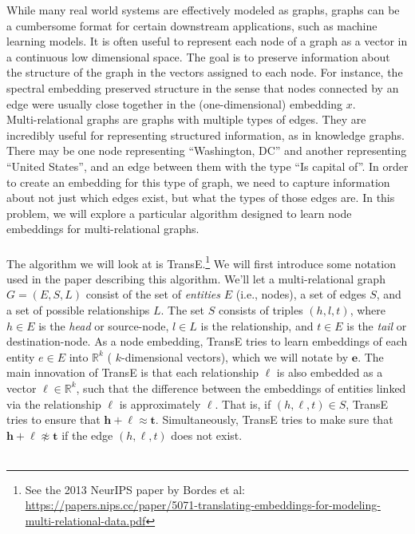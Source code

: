 \documentclass{article}
\numberwithin{figure}{section}
\begin{document}
While many real world systems are effectively modeled as graphs, graphs can be a cumbersome format for certain downstream applications, such as machine learning models. It is often useful to represent each node of a graph as a vector in a continuous low dimensional space. The goal is to preserve information about the structure of the graph in the vectors assigned to each node. For instance, the spectral embedding preserved structure in the sense that nodes connected by an edge were usually close together in the (one-dimensional) embedding $x$.\\

\noindent Multi-relational graphs are graphs with multiple types of edges. They are incredibly useful for representing structured information, as in knowledge graphs. There may be one node representing “Washington, DC” and another representing “United States”, and an edge between them with the type “Is capital of”. In order to create an embedding for this type of graph, we need to capture information about not just which edges exist, but what the types of those edges are. In this problem, we will explore a particular algorithm designed to learn node embeddings for multi-relational graphs. \\\\
The algorithm we will look at is TransE.\footnote{See the 2013 NeurIPS paper by Bordes et al: \url{https://papers.nips.cc/paper/5071-translating-embeddings-for-modeling-multi-relational-data.pdf}}
We will first introduce some notation used in the paper describing this algorithm.
We’ll let a multi-relational graph $G = (E, S, L)$ consist of the set of \textit{entities} $E$ (i.e., nodes), a set of edges $S$, and a set of possible relationships $L$.
The set $S$ consists of triples $(h, l, t)$, where $h \in E$ is the \textit{head} or source-node, $l \in L$ is the relationship, and $t \in E$ is the \textit{tail} or destination-node.
As a node embedding, TransE tries to learn embeddings of each entity $e \in E$ into $\mathbb{R}^k$ ( $k$-dimensional vectors), which we will notate by $\mathbf{e}$. The main innovation of TransE is that each relationship $\ell$ is also embedded as a vector $\boldsymbol{\ell} \in \mathbb{R}^k$, such that the difference between the embeddings of entities linked via the relationship $\ell$ is approximately $\boldsymbol{\ell}$. That is, if $(h, \ell, t) \in S$, TransE tries to ensure that $\mathbf{h}+\boldsymbol{\ell} \approx \mathbf{t}$. Simultaneously, TransE tries to make sure that $\mathbf{h}+\boldsymbol{\ell} \not\approx \mathbf{t}$ if the edge $(h, \ell, t)$ does not exist.\\\\
\end{document}
